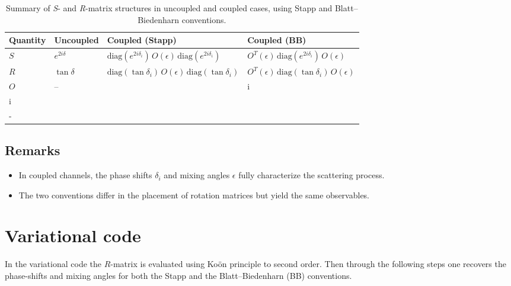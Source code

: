 \documentclass[10pt,a4paper]{article}
\begin{document}
	\begin{table}[h!]
		\centering
		\renewcommand{\arraystretch}{1.5}
		\begin{tabular}{| >{\centering\arraybackslash}m{} | >{\centering\arraybackslash}m{2cm} | >{\centering\arraybackslash}m{5cm} | >{\centering\arraybackslash}m{5cm} |}
			\hline
			\textbf{Quantity} & \textbf{Uncoupled} & \textbf{Coupled (Stapp)} & \textbf{Coupled (BB)} \\
			\hline
			$S$ & 
			$e^{2i\delta}$ &  $\mathrm{diag}(e^{2i\delta_i})\,O(\epsilon) \,\mathrm{diag}(e^{2i\delta_i}) $ & 
			$O^T(\epsilon) \, \mathrm{diag}(e^{2i\delta_i}) \, O(\epsilon)$ \\
			\hline
			$R$ & 
			$\tan\delta$ & 
			$\mathrm{diag}(\tan\delta_i)\,
			O(\epsilon) \, \mathrm{diag}(\tan\delta_i)$ & 
			$O^T(\epsilon) \, \mathrm{diag}(\tan\delta_i) \, O(\epsilon)$ \\
			\hline
			$O$ & 
			-- & 
			\( O(\epsilon) = \begin{pmatrix} \cos2\epsilon & i\sin2\epsilon \\ i\sin2\epsilon & \cos2\epsilon \end{pmatrix} \) & 
			\( O(\epsilon) = \begin{pmatrix} \cos \epsilon & \sin \epsilon \\ -\sin \epsilon & \cos \epsilon \end{pmatrix} \) \\
			\hline
		\end{tabular}
		\caption{Summary of \textit{S}- and \textit{R}-matrix structures in uncoupled and coupled cases, using Stapp \cite{Stapp} and Blatt--Biedenharn \cite{BB} conventions.}
		\label{tab:s_r_matrices}
	\end{table}
	
	\subsection{Remarks}
	
	\begin{itemize}
		\item In coupled channels, the phase shifts \( \delta_i \) and mixing angles \( \epsilon \) fully characterize the scattering process.
		\item The two conventions differ in the placement of rotation matrices but yield the same observables.
	\end{itemize}
	
	
	\section{Variational code}
	In the variational code the $R$-matrix is evaluated using Ko\"on principle to second order. Then through the following steps one recovers the phase-shifts and mixing angles for both the Stapp and the Blatt--Biedenharn (BB) conventions.
	
\end{document}
